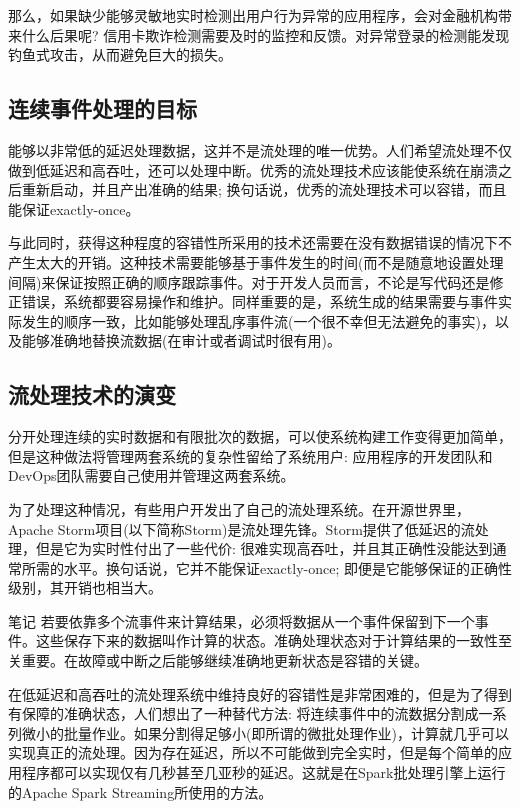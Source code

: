 \documentclass[oneside]{ctexbook}
\begin{document}
那么，如果缺少能够灵敏地实时检测出用户行为异常的应用程序，会对金融机构带来什么后果呢? 信用卡欺诈检测需要及时的监控和反馈。对异常登录的检测能发现钓鱼式攻击，从而避免巨大的损失。

\subsection{连续事件处理的目标}

能够以非常低的延迟处理数据，这并不是流处理的唯一优势。人们希望流处理不仅做到低延迟和高吞吐，还可以处理中断。优秀的流处理技术应该能使系统在崩溃之后重新启动，并且产出准确的结果; 换句话说，优秀的流处理技术可以容错，而且能保证exactly-once。

与此同时，获得这种程度的容错性所采用的技术还需要在没有数据错误的情况下不产生太大的开销。这种技术需要能够基于事件发生的时间(而不是随意地设置处理间隔)来保证按照正确的顺序跟踪事件。对于开发人员而言，不论是写代码还是修正错误，系统都要容易操作和维护。同样重要的是，系统生成的结果需要与事件实际发生的顺序一致，比如能够处理乱序事件流(一个很不幸但无法避免的事实)，以及能够准确地替换流数据(在审计或者调试时很有用)。

\subsection{流处理技术的演变}

分开处理连续的实时数据和有限批次的数据，可以使系统构建工作变得更加简单，但是这种做法将管理两套系统的复杂性留给了系统用户: 应用程序的开发团队和DevOps团队需要自己使用并管理这两套系统。

为了处理这种情况，有些用户开发出了自己的流处理系统。在开源世界里，Apache Storm项目(以下简称Storm)是流处理先锋。Storm提供了低延迟的流处理，但是它为实时性付出了一些代价: 很难实现高吞吐，并且其正确性没能达到通常所需的水平。换句话说，它并不能保证exactly-once; 即便是它能够保证的正确性级别，其开销也相当大。

\begin{bclogo}[logo=\bcinfo, couleurBarre=orange, noborder=true, couleur=white]{笔记}
若要依靠多个流事件来计算结果，必须将数据从一个事件保留到下一个事件。这些保存下来的数据叫作计算的状态。准确处理状态对于计算结果的一致性至关重要。在故障或中断之后能够继续准确地更新状态是容错的关键。
\end{bclogo}

在低延迟和高吞吐的流处理系统中维持良好的容错性是非常困难的，但是为了得到有保障的准确状态，人们想出了一种替代方法: 将连续事件中的流数据分割成一系列微小的批量作业。如果分割得足够小(即所谓的微批处理作业)，计算就几乎可以实现真正的流处理。因为存在延迟，所以不可能做到完全实时，但是每个简单的应用程序都可以实现仅有几秒甚至几亚秒的延迟。这就是在Spark批处理引擎上运行的Apache Spark Streaming所使用的方法。
\end{document}
